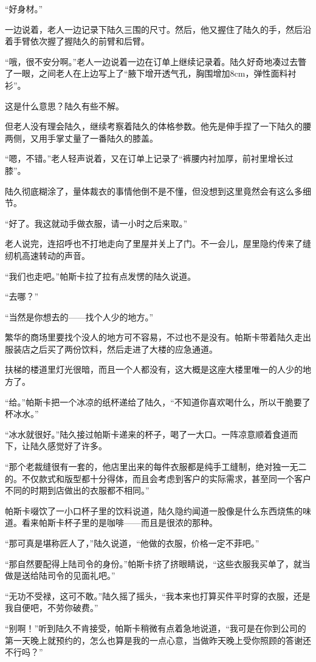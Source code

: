“好身材。”

一边说着，老人一边记录下陆久三围的尺寸。然后，他又握住了陆久的手，然后沿着手臂依次握了握陆久的前臂和后臂。

“哦，很不安分啊。”老人一边说着一边在订单上继续记录着。陆久好奇地凑过去瞥了一眼，之间老人在上边写上了“腋下增开透气孔，胸围增加8cm，弹性面料衬衫”。

这是什么意思？陆久有些不解。

但老人没有理会陆久，继续考察着陆久的体格参数。他先是伸手捏了一下陆久的腰两侧，又用手掌丈量了一番陆久的膝盖。

“嗯，不错。”老人轻声说着，又在订单上记录了“裤腰内衬加厚，前衬里增长过膝”。

陆久彻底糊涂了，量体裁衣的事情他倒不是不懂，但没想到这里竟然会有这么多细节。

“好了。我这就动手做衣服，请一小时之后来取。”

老人说完，连招呼也不打地走向了里屋并关上了门。不一会儿，屋里隐约传来了缝纫机高速转动的声音。

“我们也走吧。”帕斯卡拉了拉有点发愣的陆久说道。

“去哪？”

“当然是你想去的——找个人少的地方。”

繁华的商场里要找个没人的地方可不容易，不过也不是没有。帕斯卡带着陆久走出服装店之后买了两份饮料，然后走进了大楼的应急通道。

扶梯的楼道里灯光很暗，而且一个人都没有，这大概是这座大楼里唯一的人少的地方了。

“给。”帕斯卡把一个冰凉的纸杯递给了陆久，“不知道你喜欢喝什么，所以干脆要了杯冰水。”

“冰水就很好。”陆久接过帕斯卡递来的杯子，喝了一大口。一阵凉意顺着食道而下，让陆久感觉好了许多。

“那个老裁缝很有一套的，他店里出来的每件衣服都是纯手工缝制，绝对独一无二的。不仅款式和版型都十分得体，而且会考虑到客户的实际需求，甚至同一个客户不同的时期到店做出的衣服都不相同。”

帕斯卡啜饮了一小口杯子里的饮料说道，陆久隐约闻道一股像是什么东西烧焦的味道。看来帕斯卡杯子里的是咖啡——而且是很浓的那种。

“那可真是堪称匠人了，”陆久说道，“他做的衣服，价格一定不菲吧。”

“那自然要配得上陆司令的身份。”帕斯卡挤了挤眼睛说，“这些衣服我买单了，就当做是送给陆司令的见面礼吧。”

“无功不受禄，这可不敢。”陆久摇了摇头，“我本来也打算买件平时穿的衣服，还是我自便吧，不劳你破费。”

“别啊！”听到陆久不肯接受，帕斯卡稍微有点着急地说道，“我可是在你到公司的第一天晚上就预约的，怎么也算是我的一点心意，当做昨天晚上受你照顾的答谢还不行吗？”

